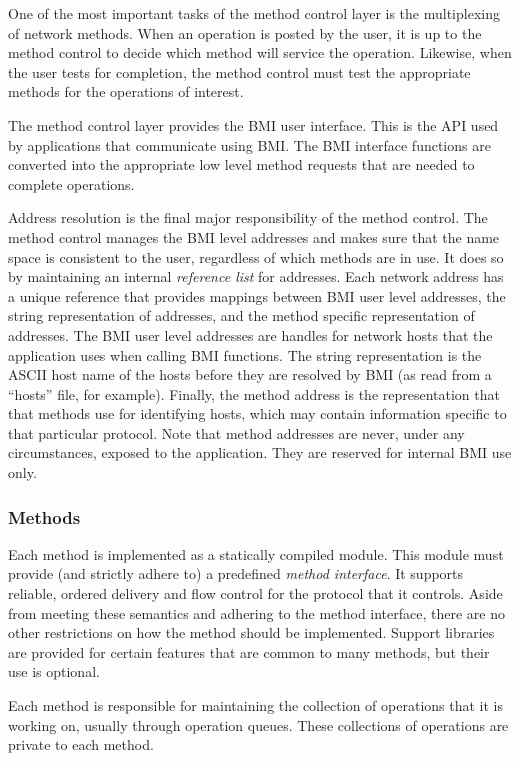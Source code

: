\documentclass[11pt]{article}
\begin{document}
One of the most important tasks of the method control layer is the
multiplexing of network methods.  When an operation is
posted by the user, it is up to the method control to decide which
method will service the operation.  Likewise, when the user tests for
completion, the method control must test the appropriate methods for
the operations of interest.

The method control layer provides the BMI user interface.  This is
the API used by applications that communicate using BMI.  The BMI
interface functions are converted into the appropriate low level method
requests that are needed to complete operations.

Address resolution is the final major responsibility of the method
control.  The method control manages the BMI level addresses and makes
sure that the
name space is consistent to the user, regardless of which methods are
in use.  It does so by maintaining an internal \emph{reference list} for
addresses.  Each network address has a unique reference that provides
mappings between BMI user level addresses, the string representation
of addresses, and the method specific representation of addresses.
The BMI user level addresses are handles for network hosts that the
application uses when calling BMI functions.  The string representation
is the ASCII host name of the hosts before they are resolved by BMI (as
read from a ``hosts'' file, for example).
Finally, the method address is the representation that that methods use
for identifying hosts, which may contain information specific
to that particular protocol.  Note that method addresses are never,
under any circumstances, exposed to the application.  They are
reserved for internal BMI use only.

\subsubsection{Methods}

Each method is implemented as a statically compiled module.  This
module must provide (and strictly adhere to) a predefined \emph{method
interface}.  It supports reliable, ordered delivery and flow control for
the protocol that it controls.  Aside from meeting these semantics and
adhering to the method interface, there are no other restrictions on
how the method should be implemented.  Support libraries are provided
for certain features that are common to many methods, but their use
is optional.

Each method is responsible for maintaining the collection of
operations that it is working on, usually through operation queues.
These collections of operations are private to each method.
\end{document}

